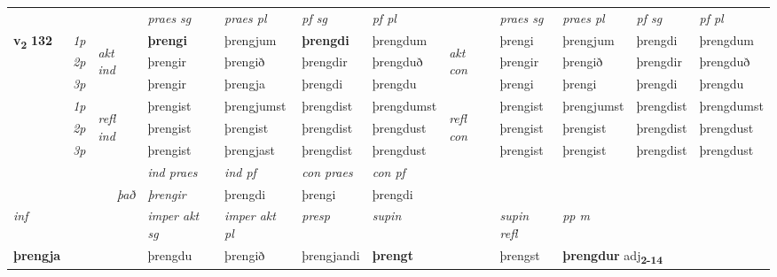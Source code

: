 \begin{longtable}[l]{X>{\footnotesize\itshape}llXXXXlXXXX}
 & &   & \textit{praes sg}  & \textit{praes pl}    & \textit{ pf sg} & \textit{pf pl} & & \textit{praes sg}  & \textit{praes pl}    & \textit{pf sg} & \textit{pf pl }  \\ \cmidrule{4-7} \cmidrule{9-12}
 \multirow{2}{*}{{{\textbf{v{\textsubscript{2}}} \Large{\textbf{132}}}}}  & 1p & \multirow{3}{*}{\begin{turn}{90}\textit{akt ind}\end{turn}} & \textbf{þrengi} & þrengjum & \textbf{þrengdi} & þrengdum & \multirow{3}{*}{\begin{turn}{90}\textit{akt con}\end{turn}} &þrengi & þrengjum & þrengdi & þrengdum\\*
 & 2p &  &  þrengir  & þrengið & þrengdir & þrengduð & & þrengir & þrengið & þrengdir & þrengduð \\*
 & 3p &  & þrengir & þrengja & þrengdi & þrengdu & & þrengi & þrengi& þrengdi & þrengdu \\*
\cmidrule{4-7} \cmidrule{9-12}
 & 1p & \multirow{3}{*}{\begin{turn}{90}\textit{refl ind}\end{turn}}  & þrengist & þrengjumst & þrengdist & þrengdumst & \multirow{3}{*}{\begin{turn}{90}\textit{refl con}\end{turn}}  &þrengist & þrengjumst & þrengdist & þrengdumst \\*
 & 2p &  & þrengist & þrengist & þrengdist & þrengdust & &þrengist & þrengist & þrengdist & þrengdust \\*
 & 3p  & & þrengist & þrengjast & þrengdist & þrengdust & & þrengist & þrengist& þrengdist & þrengdust \\*
\cmidrule{4-7} \cmidrule{9-12}

   && &  \textit{ind praes} & \textit{ind pf} & \textit{con praes} & \textit{con pf} \\*
\multicolumn{3}{r}{\textit{það}} & þrengir & þrengdi & þrengi & þrengdi \\*

\cmidrule{4-7}
   {\textit{inf}} & &  & \textit{imper akt sg} & \textit{imper akt pl}   & \textit{presp} & \textit{supin} && \textit{supin refl} & \textit{pp m} \\*
  {\textbf{þrengja}} & && þrengdu  & þrengið   & þrengjandi &  \textbf{þrengt} && þrengst & \multicolumn{2}{l}{\textbf{þrengdur} adj\textbf{\textsubscript{2-14}}} \\*


\end{longtable}
